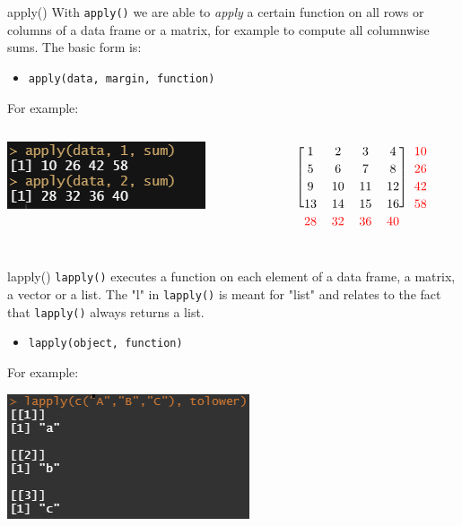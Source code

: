 \documentclass[xcolor=dvipsnames, aspectratio = 169]{beamer}
\begin{document}
\begin{frame}[fragile]{apply()}
	With \verb+apply()+ we are able to \textit{apply} a certain function on all rows or columns of a data frame or a matrix, for example to compute all columnwise sums. The basic form is:
	\begin{itemize}
		\item \verb+apply(data, margin, function)+
	\end{itemize}
	For example:
	\begin{columns}[T]
		\begin{column}{0.5\textwidth}
			\includegraphics{Apply}
		\end{column}
		\begin{column}{0.4\textwidth}
			\[
			\renewcommand\BAextrarowheight{2pt}
			\begin{blockarray}{*{5}{c}}
				\begin{block}{[*{4}{c}]{c}}
				    1 &2 &3 &4&\textcolor{red}{10}\\
				    5 &6 &7 &8&\textcolor{red}{26}\\
				    9 &10 &11 &12&\textcolor{red}{42}\\
				    13 &14 &15 &16&\textcolor{red}{58}\\
				\end{block}
				\textcolor{red}{28} & \textcolor{red}{32} & \textcolor{red}{36} & \textcolor{red}{40}
			\end{blockarray}
			\]
		\end{column}
	\end{columns}
	
\end{frame}

\begin{frame}[fragile]{lapply()}
	\verb+lapply()+ executes a function on each element of a data frame, a matrix, a vector or a list. The "l" in \verb+lapply()+ is meant for "list" and relates to the fact that \verb+lapply()+ always returns a list.
	\begin{itemize}
		\item \verb+lapply(object, function)+
	\end{itemize}
	For example:\\
	\begin{center}
		\includegraphics{lapply}
	\end{center}
	
	
\end{frame}
\end{document}

